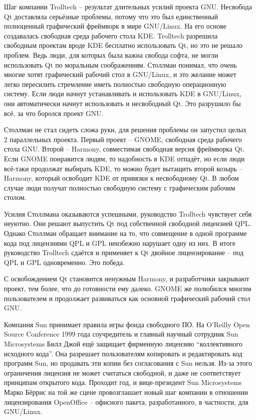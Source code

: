 Шаг компании Trolltech -- результат длительных усилий проекта GNU. Несвобода Qt доставляла серьёзные проблемы, потому что это был единственный полноценный графический фреймворк в мире GNU/Linux. На его основе создавалась свободная среда рабочего стола KDE. Trolltech разрешила свободным проектам вроде KDE бесплатно использовать Qt, но это не решало проблем. Ведь люди, для которых была важна свобода софта, не могли использовать Qt по моральным соображениям. Столлман понимал, что очень многие хотят графический рабочий стол в GNU/Linux, и это желание может легко пересилить стремление иметь полностью свободную операционную систему. Если люди начнут устанавливать и использовать KDE в GNU/Linux, они автоматически начнут использовать и несвободный Qt. Это разрушило бы всё, за что боролся проект GNU.

Столлман не стал сидеть сложа руки, для решения проблемы он запустил целых 2 параллельных проекта. Первый проект -- GNOME, свободная среда рабочего стола GNU. Второй -- Harmony, совместимая свободная версия фреймворка Qt. Если GNOME понравится людям, то надобность в KDE отпадёт, но если люди всё-таки продолжат выбирать KDE, то можно будет вытащить второй козырь -- Harmony, который освободит KDE от привязки к несвободному Qt. В любом случае люди получат полностью свободную систему с графическим рабочим столом.

Усилия Столлмана оказываются успешными, руководство Trolltech чувствует себя неуютно. Они решают выпустить Qt под собственной свободной лицензией QPL. Однако Столлман обращает внимание на то, что совмещение в одной программе кода под лицензиями QPL и GPL неизбежно нарушает одну из них. В итоге руководство Trolltech сдаётся и применяет к Qt двойное лицензирование -- под QPL и GPL одновременно. Это победа.

С освобождением Qt становится ненужным Harmony, и разработчики закрывают проект, тем более, что до готовности ему далеко. GNOME же полюбился многим пользователем и продолжает развиваться как основной графический рабочий стол GNU.

Компания Sun принимает правила игры фонда свободного ПО. На O'Reilly Open Source Conference 1999 года соучредитель и главный научный сотрудник Sun Microsystems Билл Джой ещё защищает фирменную лицензию \enquote{коллективного исходного кода}. Она разрешает пользователям копировать и редактировать код программ Sun, но продавать эти копии без согласования с Sun нельзя. Из-за этого ограничения лицензия не может считаться свободной, и даже не соответствует принципам открытого кода. Проходит год, и вице-президент Sun Microsystems Марко Бёррис на той же сцене провозглашает новый шаг компании в отношении лицензирования OpenOffice -- офисного пакета, разработанного, в частности, для GNU/Linux.

